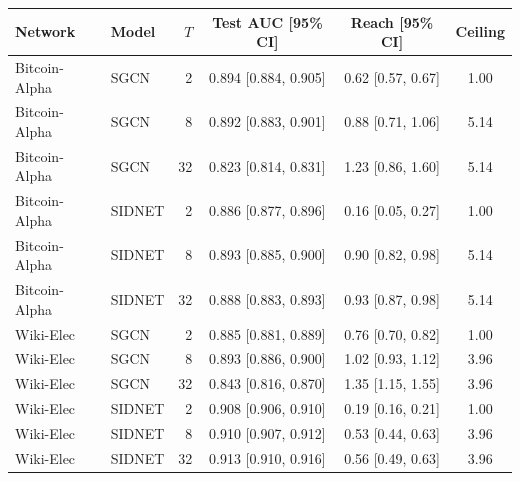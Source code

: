 \begin{tabular}{@{}llrccc@{}}
\toprule
Network & Model & $T$ & Test AUC [95\% CI] & Reach [95\% CI] & Ceiling \\
\midrule
Bitcoin-Alpha & SGCN & 2 & 0.894 [0.884, 0.905] & 0.62 [0.57, 0.67] & 1.00 \\
Bitcoin-Alpha & SGCN & 8 & 0.892 [0.883, 0.901] & 0.88 [0.71, 1.06] & 5.14 \\
Bitcoin-Alpha & SGCN & 32 & 0.823 [0.814, 0.831] & 1.23 [0.86, 1.60] & 5.14 \\
Bitcoin-Alpha & SIDNET & 2 & 0.886 [0.877, 0.896] & 0.16 [0.05, 0.27] & 1.00 \\
Bitcoin-Alpha & SIDNET & 8 & 0.893 [0.885, 0.900] & 0.90 [0.82, 0.98] & 5.14 \\
Bitcoin-Alpha & SIDNET & 32 & 0.888 [0.883, 0.893] & 0.93 [0.87, 0.98] & 5.14 \\
Wiki-Elec & SGCN & 2 & 0.885 [0.881, 0.889] & 0.76 [0.70, 0.82] & 1.00 \\
Wiki-Elec & SGCN & 8 & 0.893 [0.886, 0.900] & 1.02 [0.93, 1.12] & 3.96 \\
Wiki-Elec & SGCN & 32 & 0.843 [0.816, 0.870] & 1.35 [1.15, 1.55] & 3.96 \\
Wiki-Elec & SIDNET & 2 & 0.908 [0.906, 0.910] & 0.19 [0.16, 0.21] & 1.00 \\
Wiki-Elec & SIDNET & 8 & 0.910 [0.907, 0.912] & 0.53 [0.44, 0.63] & 3.96 \\
Wiki-Elec & SIDNET & 32 & 0.913 [0.910, 0.916] & 0.56 [0.49, 0.63] & 3.96 \\
\bottomrule
\end{tabular}
